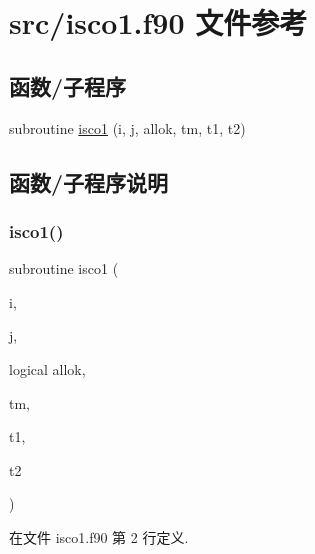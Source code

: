 \hypertarget{isco1_8f90}{}\section{src/isco1.f90 文件参考}
\label{isco1_8f90}
\subsection*{函数/子程序}
\begin{DoxyCompactItemize}
\item 
subroutine \mbox{\hyperlink{isco1_8f90_ae805535030ce5e9144a20555e68aea39}{isco1}} (i, j, allok, tm, t1, t2)
\end{DoxyCompactItemize}


\subsection{函数/子程序说明}
\mbox{\label{isco1_8f90_ae805535030ce5e9144a20555e68aea39}} 
\subsubsection{\texorpdfstring{isco1()}{isco1()}}
{\footnotesize\ttfamily subroutine isco1 (\begin{DoxyParamCaption}\item[{}]{i,  }\item[{}]{j,  }\item[{logical}]{allok,  }\item[{}]{tm,  }\item[{}]{t1,  }\item[{}]{t2 }\end{DoxyParamCaption})}



在文件 isco1.\+f90 第 2 行定义.

